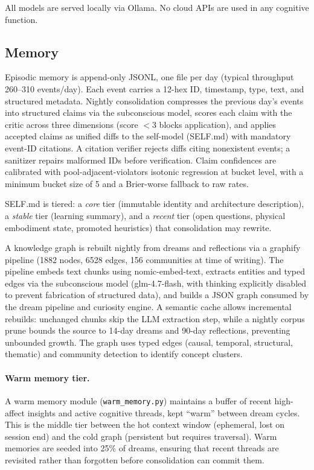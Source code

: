 \documentclass[11pt,a4paper]{article}
\begin{document}
All models are served locally via Ollama. No cloud APIs are used in any cognitive function.

\subsection{Memory}

Episodic memory is append-only JSONL, one file per day (typical throughput 260--310 events/day). Each event carries a 12-hex ID, timestamp, type, text, and structured metadata. Nightly consolidation compresses the previous day's events into structured claims via the subconscious model, scores each claim with the critic across three dimensions (score $< 3$ blocks application), and applies accepted claims as unified diffs to the self-model (SELF.md) with mandatory event-ID citations. A citation verifier rejects diffs citing nonexistent events; a sanitizer repairs malformed IDs before verification. Claim confidences are calibrated with pool-adjacent-violators isotonic regression at bucket level, with a minimum bucket size of 5 and a Brier-worse fallback to raw rates.

SELF.md is tiered: a \emph{core} tier (immutable identity and architecture description), a \emph{stable} tier (learning summary), and a \emph{recent} tier (open questions, physical embodiment state, promoted heuristics) that consolidation may rewrite.

A knowledge graph is rebuilt nightly from dreams and reflections via a graphify pipeline (1882 nodes, 6528 edges, 156 communities at time of writing). The pipeline embeds text chunks using nomic-embed-text, extracts entities and typed edges via the subconscious model (glm-4.7-flash, with thinking explicitly disabled to prevent fabrication of structured data), and builds a JSON graph consumed by the dream pipeline and curiosity engine. A semantic cache allows incremental rebuilds: unchanged chunks skip the LLM extraction step, while a nightly corpus prune bounds the source to 14-day dreams and 90-day reflections, preventing unbounded growth. The graph uses typed edges (causal, temporal, structural, thematic) and community detection to identify concept clusters.

\paragraph{Warm memory tier.} A warm memory module (\texttt{warm\_memory.py}) maintains a buffer of recent high-affect insights and active cognitive threads, kept ``warm'' between dream cycles. This is the middle tier between the hot context window (ephemeral, lost on session end) and the cold graph (persistent but requires traversal). Warm memories are seeded into 25\% of dreams, ensuring that recent threads are revisited rather than forgotten before consolidation can commit them.
\end{document}
